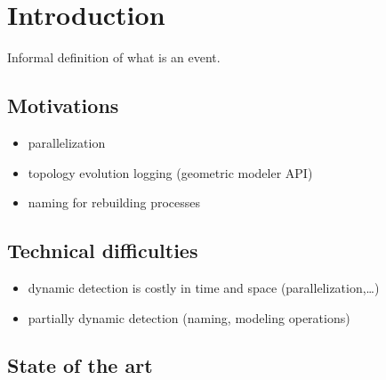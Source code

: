 \documentclass[../main.tex]{subfiles}
\begin{document}
\section[Introduction]{Introduction}
\label{sec:introduction}

Informal definition of what is an event.
\subsection[Motivations]{Motivations}
\label{sec:motivations}

\begin{itemize}
  \item parallelization
  \item topology evolution logging (geometric modeler API)
  \item naming for rebuilding processes
\end{itemize}

\subsection[Technical difficulties]{Technical difficulties}
\label{sec:technical-difficulties}

\begin{itemize}
  \item dynamic detection is costly in time and space (parallelization,…)
  \item partially dynamic detection (naming, modeling operations)
\end{itemize}

\subsection[State of the art]{State of the art}
\label{sec:state-art}
\end{document}
